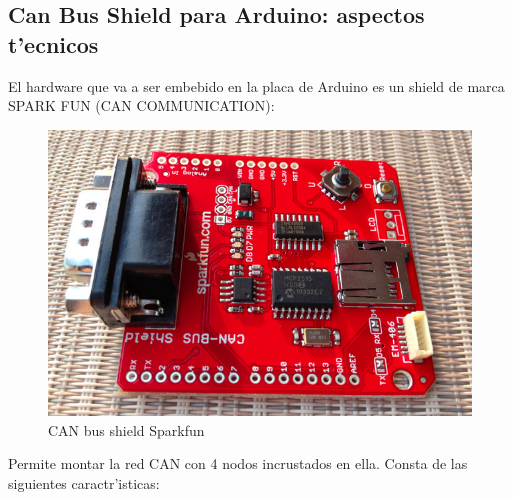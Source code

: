 \subsection{Can Bus Shield para Arduino: aspectos t'ecnicos}

El hardware que va a ser embebido en la placa de Arduino es un shield de marca SPARK FUN (CAN COMMUNICATION):
\begin{figure}[ht]
	\centering
		\includegraphics[scale=0.4]{shieldcan}
	\caption{CAN bus shield Sparkfun}
	\label{fig:sparkfun}
\end{figure}

Permite montar la red CAN con 4 nodos incrustados en ella. Consta de las siguientes caractr'isticas:

